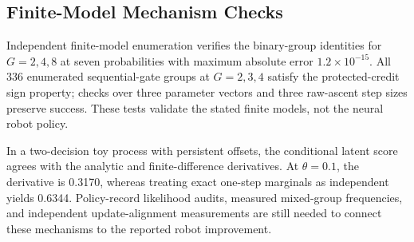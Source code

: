 \subsection{Finite-Model Mechanism Checks}
Independent finite-model enumeration verifies the binary-group identities for $G=2,4,8$ at seven probabilities with maximum absolute error $1.2\times10^{-15}$. All 336 enumerated sequential-gate groups at $G=2,3,4$ satisfy the protected-credit sign property; checks over three parameter vectors and three raw-ascent step sizes preserve success. These tests validate the stated finite models, not the neural robot policy.

In a two-decision toy process with persistent offsets, the conditional latent score agrees with the analytic and finite-difference derivatives. At $\theta=0.1$, the derivative is 0.3170, whereas treating exact one-step marginals as independent yields 0.6344. Policy-record likelihood audits, measured mixed-group frequencies, and independent update-alignment measurements are still needed to connect these mechanisms to the reported robot improvement.
